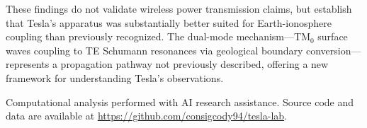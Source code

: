 \documentclass[12pt,preprint,amsmath,amssymb]{revtex4-2}
\begin{document}
These findings do not validate wireless power transmission claims, but establish that Tesla's apparatus
was substantially better suited for Earth-ionosphere coupling than previously recognized. The dual-mode
mechanism---TM$_0$ surface waves coupling to TE Schumann resonances via geological boundary
conversion---represents a propagation pathway not previously described, offering a new framework for
understanding Tesla's observations.

\begin{acknowledgments}
Computational analysis performed with AI research assistance. Source code and data are available at
\url{https://github.com/consigcody94/tesla-lab}.
\end{acknowledgments}


\end{document}
